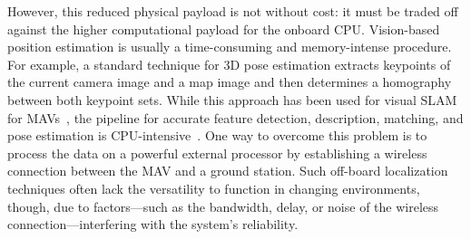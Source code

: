 However, this reduced physical payload is not without cost: it must be
traded off against the higher computational payload for the onboard
CPU. Vision-based position estimation is usually a time-consuming and memory-intense procedure. 
For example, a standard technique for 3D pose estimation extracts
keypoints of the current camera image and a map image and then
determines a homography between both keypoint sets. While this
approach has been used for visual SLAM for
MAVs~\cite{blosch2010vision}, the pipeline for accurate feature
detection, description, matching, and pose estimation is
CPU-intensive~\cite{kendall2015convolutional}.
One way to overcome this problem is to process the data on a powerful
external processor by establishing a wireless connection between the
MAV and a ground station. Such off-board localization techniques often
lack the versatility to function in changing environments, though, due
to factors---such as the bandwidth, delay, or noise of the wireless
connection---interfering with the system's reliability.
